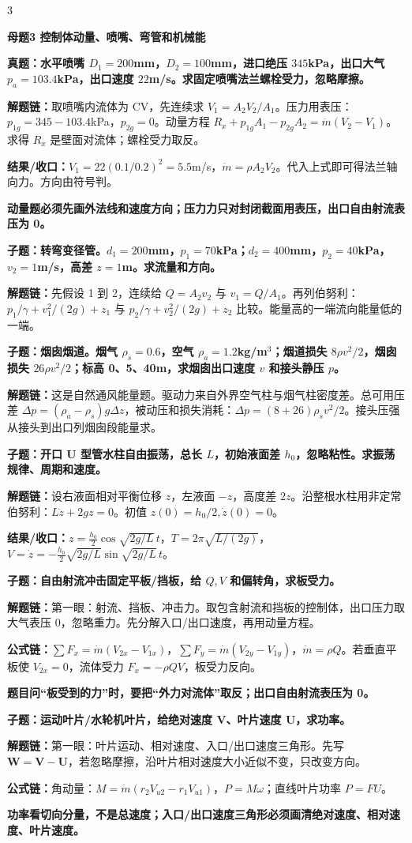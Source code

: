 \documentclass[a4paper]{article}
\newcommand{\mt}[1]{\vspace{0.45pt}\colorbox{M}{\parbox{\dimexpr\linewidth-2\fboxsep}{\color{white}\bfseries #1}}\par}
\newcommand{\qt}[1]{\vspace{0.25pt}\colorbox{Q}{\parbox{\dimexpr\linewidth-2\fboxsep}{\color{white}\bfseries #1}}\par}
\newcommand{\warn}[1]{\colorbox{Y}{\parbox{\dimexpr\linewidth-2\fboxsep}{\color{E}\bfseries #1}}\par}
\newcommand{\chain}[1]{{\color{A}\bfseries 解题链：}#1\par}
\newcommand{\res}[1]{{\color{E}\bfseries 结果/收口：}#1\par}
\newcommand{\form}[1]{{\color{M}\bfseries 公式链：}#1\par}
\begin{document}
\begin{multicols}{3}
\mt{母题3 控制体动量、喷嘴、弯管和机械能}
\qt{真题：水平喷嘴 $D_1=200$mm，$D_2=100$mm，进口绝压 $345$kPa，出口大气 $p_a=103.4$kPa，出口速度 $22$m/s。求固定喷嘴法兰螺栓受力，忽略摩擦。}
\chain{取喷嘴内流体为 CV，先连续求 $V_1=A_2V_2/A_1$。压力用表压：$p_{1g}=345-103.4$kPa，$p_{2g}=0$。动量方程 $R_x+p_{1g}A_1-p_{2g}A_2=\dot m(V_2-V_1)$。求得 $R_x$ 是壁面对流体；螺栓受力取反。}
\res{$V_1=22(0.1/0.2)^2=5.5$m/s，$\dot m=\rho A_2V_2$。代入上式即可得法兰轴向力。方向由符号判。}
\warn{动量题必须先画外法线和速度方向；压力力只对封闭截面用表压，出口自由射流表压为 0。}

\qt{子题：转弯变径管。$d_1=200$mm，$p_1=70$kPa；$d_2=400$mm，$p_2=40$kPa，$v_2=1$m/s，高差 $z=1$m。求流量和方向。}
\chain{先假设 1 到 2，连续给 $Q=A_2v_2$ 与 $v_1=Q/A_1$。再列伯努利：$p_1/\gamma+v_1^2/(2g)+z_1$ 与 $p_2/\gamma+v_2^2/(2g)+z_2$ 比较。能量高的一端流向能量低的一端。}

\qt{子题：烟囱烟道。烟气 $\rho_s=0.6$，空气 $\rho_a=1.2$kg/m$^3$；烟道损失 $8\rho v^2/2$，烟囱损失 $26\rho v^2/2$；标高 0、5、40m，求烟囱出口速度 $v$ 和接头静压 $p$。}
\chain{这是自然通风能量题。驱动力来自外界空气柱与烟气柱密度差。总可用压差 $\Delta p=(\rho_a-\rho_s)g\Delta z$，被动压和损失消耗：$\Delta p=(8+26)\rho_s v^2/2$。接头压强从接头到出口列烟囱段能量求。}

\qt{子题：开口 U 型管水柱自由振荡，总长 $L$，初始液面差 $h_0$，忽略粘性。求振荡规律、周期和速度。}
\chain{设右液面相对平衡位移 $z$，左液面 $-z$，高度差 $2z$。沿整根水柱用非定常伯努利：$L\ddot z+2gz=0$。初值 $z(0)=h_0/2,\dot z(0)=0$。}
\res{$z=\frac{h_0}{2}\cos\sqrt{2g/L}\,t$，$T=2\pi\sqrt{L/(2g)}$，$V=\dot z=-\frac{h_0}{2}\sqrt{2g/L}\sin\sqrt{2g/L}\,t$。}

\qt{子题：自由射流冲击固定平板/挡板，给 $Q,V$ 和偏转角，求板受力。}
\chain{第一眼：射流、挡板、冲击力。取包含射流和挡板的控制体，出口压力取大气表压 0，忽略重力。先分解入口/出口速度，再用动量方程。}
\form{$\sum F_x=\dot m(V_{2x}-V_{1x})$，$\sum F_y=\dot m(V_{2y}-V_{1y})$，$\dot m=\rho Q$。若垂直平板使 $V_{2x}=0$，流体受力 $F_x=-\rho QV$，板受力反向。}
\warn{题目问“板受到的力”时，要把“外力对流体”取反；出口自由射流表压为 0。}

\qt{子题：运动叶片/水轮机叶片，给绝对速度 $\bm V$、叶片速度 $\bm U$，求功率。}
\chain{第一眼：叶片运动、相对速度、入口/出口速度三角形。先写 $\bm W=\bm V-\bm U$，若忽略摩擦，沿叶片相对速度大小近似不变，只改变方向。}
\form{角动量：$M=\dot m(r_2V_{u2}-r_1V_{u1})$，$P=M\omega$；直线叶片功率 $P=FU$。}
\warn{功率看切向分量，不是总速度；入口/出口速度三角形必须画清绝对速度、相对速度、叶片速度。}


\end{multicols}
\end{document}
